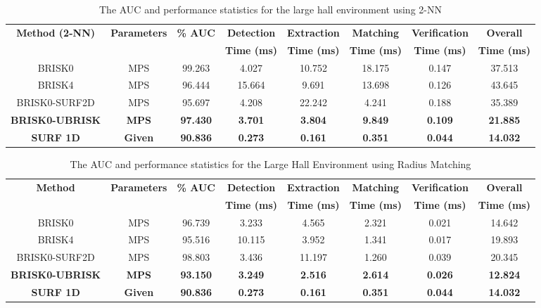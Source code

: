 \documentclass[11pt]{report}
\begin{document}
\begin{table}
\caption{The AUC and performance statistics for the large hall environment
using 2-NN}
\footnotesize
\begin{tabular}{|c|c|c|c|c|c|c|c|}
\hline 
\textbf{Method (2-NN)} & \textbf{Parameters} & \textbf{\% AUC} & \textbf{Detection} & \textbf{Extraction} & \textbf{Matching} & \textbf{Verification} & \textbf{Overall}\tabularnewline
 &  &  & \textbf{Time (ms)} & \textbf{Time (ms)} & \textbf{Time (ms)} & \textbf{Time (ms)} & \textbf{Time (ms)}\tabularnewline
\hline 
\hline 
BRISK0 & MPS & 99.263 & 4.027 & 10.752 & 18.175 & 0.147 & 37.513\tabularnewline
\hline 
BRISK4 & MPS & 96.444 & 15.664 & 9.691 & 13.698 & 0.126 & 43.645\tabularnewline
\hline 
BRISK0-SURF2D & MPS & 95.697 & 4.208 & 22.242 & 4.241 & 0.188 & 35.389\tabularnewline
\hline 
\textbf{BRISK0-UBRISK} & \textbf{MPS} & \textbf{97.430} & \textbf{3.701} & \textbf{3.804} & \textbf{9.849} & \textbf{0.109} & \textbf{21.885}\tabularnewline
\hline 
\textbf{SURF 1D} & \textbf{Given} & \textbf{90.836} & \textbf{0.273} & \textbf{0.161} & \textbf{0.351} & \textbf{0.044} & \textbf{14.032}\tabularnewline
\hline 
\end{tabular}
\label{tab:lh_times_knn}
\end{table}


\begin{table}
\caption{The AUC and performance statistics for the Large Hall Environment
using Radius Matching}
\footnotesize
\begin{tabular}{|c|c|c|c|c|c|c|c|}
\hline 
\textbf{Method} & \textbf{Parameters} & \textbf{\% AUC} & \textbf{Detection} & \textbf{Extraction} & \textbf{Matching} & \textbf{Verification} & \textbf{Overall}\tabularnewline
 &  &  & \textbf{Time (ms)} & \textbf{Time (ms)} & \textbf{Time (ms)} & \textbf{Time (ms)} & \textbf{Time (ms)}\tabularnewline
\hline 
\hline 
BRISK0 & MPS & 96.739 & 3.233 & 4.565 & 2.321 & 0.021 & 14.642\tabularnewline
\hline 
BRISK4 & MPS & 95.516 & 10.115 & 3.952 & 1.341 & 0.017 & 19.893\tabularnewline
\hline 
BRISK0-SURF2D & MPS & 98.803 & 3.436 & 11.197 & 1.260 & 0.039 & 20.345\tabularnewline
\hline 
\textbf{BRISK0-UBRISK} & \textbf{MPS} & \textbf{93.150} & \textbf{3.249} & \textbf{2.516} & \textbf{2.614} & \textbf{0.026} & \textbf{12.824}\tabularnewline
\hline 
\textbf{SURF 1D} & \textbf{Given} & \textbf{90.836} & \textbf{0.273} & \textbf{0.161} & \textbf{0.351} & \textbf{0.044} & \textbf{14.032}\tabularnewline
\hline 
\end{tabular}
\label{tab:lh_times_hamming}
\end{table}
\end{document}
